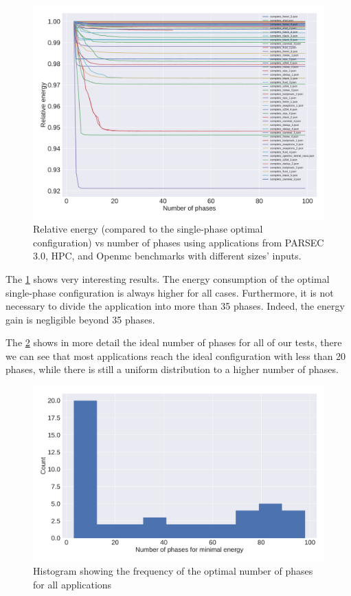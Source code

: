 \begin{figure}[H]
	\includegraphics[width=\columnwidth]{fingerprint/figures/energy_per_phase.pdf}
	\caption{Relative energy (compared to the single-phase optimal configuration) vs number of phases using applications from PARSEC 3.0, HPC, and Openmc benchmarks with different sizes' inputs.}
	\label{fig:relative_energy}
\end{figure}

The \cref{fig:relative_energy} shows very interesting results. The energy consumption of the optimal single-phase configuration is always higher for all cases. Furthermore, it is not necessary to divide the application into more than 35 phases. Indeed, the energy gain is negligible beyond 35 phases.

The \cref{fig:hist_optimal_phase} shows in more detail the ideal number of phases for all of our tests, there we can see that most applications reach the ideal configuration with less than 20 phases, while there is still a uniform distribution to a higher number of phases.

\begin{figure}[H]
	\includegraphics[width=\columnwidth]{phases/figures/min_phases_distribution.pdf}
	\caption{Histogram showing the frequency of the optimal number of phases for all applications}
	\label{fig:hist_optimal_phase}
\end{figure}

